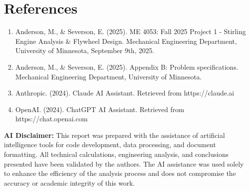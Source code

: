 \documentclass[12pt]{article}
\begin{document}
\section{References}
\begin{enumerate}
\item Anderson, M., \& Severson, E. (2025). ME 4053: Fall 2025 Project 1 - Stirling Engine Analysis \& Flywheel Design. Mechanical Engineering Department, University of Minnesota, September 9th, 2025.
\item Anderson, M., \& Severson, E. (2025). Appendix B: Problem specifications. Mechanical Engineering Department, University of Minnesota.
\item Anthropic. (2024). Claude AI Assistant. Retrieved from https://claude.ai
\item OpenAI. (2024). ChatGPT AI Assistant. Retrieved from https://chat.openai.com
\end{enumerate}

\vspace{1em}
\noindent\textbf{AI Disclaimer:} This report was prepared with the assistance of artificial intelligence tools for code development, data processing, and document formatting. All technical calculations, engineering analysis, and conclusions presented have been validated by the authors. The AI assistance was used solely to enhance the efficiency of the analysis process and does not compromise the accuracy or academic integrity of this work.
\end{document}
